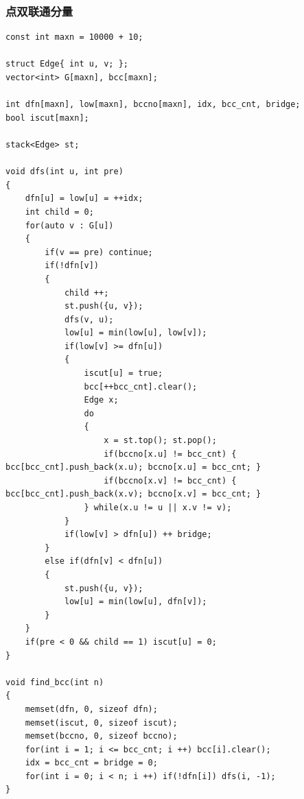 \documentclass[twoside]{article}
\begin{document}
\subsubsection{点双联通分量}
\begin{lstlisting}
const int maxn = 10000 + 10;

struct Edge{ int u, v; };
vector<int> G[maxn], bcc[maxn];

int dfn[maxn], low[maxn], bccno[maxn], idx, bcc_cnt, bridge;
bool iscut[maxn];

stack<Edge> st;

void dfs(int u, int pre)
{
	dfn[u] = low[u] = ++idx;
	int child = 0;
	for(auto v : G[u])
	{
		if(v == pre) continue;
		if(!dfn[v])
		{
			child ++;
			st.push({u, v});
			dfs(v, u);
			low[u] = min(low[u], low[v]);
			if(low[v] >= dfn[u])
			{
				iscut[u] = true;
				bcc[++bcc_cnt].clear();
				Edge x;
				do
				{
					x = st.top(); st.pop();
					if(bccno[x.u] != bcc_cnt) { bcc[bcc_cnt].push_back(x.u); bccno[x.u] = bcc_cnt; }
					if(bccno[x.v] != bcc_cnt) { bcc[bcc_cnt].push_back(x.v); bccno[x.v] = bcc_cnt; }
				} while(x.u != u || x.v != v);
			}
			if(low[v] > dfn[u]) ++ bridge;
		}
		else if(dfn[v] < dfn[u])
		{
			st.push({u, v});
			low[u] = min(low[u], dfn[v]);
		}
	}
	if(pre < 0 && child == 1) iscut[u] = 0;
}

void find_bcc(int n)
{
	memset(dfn, 0, sizeof dfn);
	memset(iscut, 0, sizeof iscut);
	memset(bccno, 0, sizeof bccno);
	for(int i = 1; i <= bcc_cnt; i ++) bcc[i].clear();
	idx = bcc_cnt = bridge = 0;
	for(int i = 0; i < n; i ++) if(!dfn[i]) dfs(i, -1);
}
\end{lstlisting}
\end{document}
